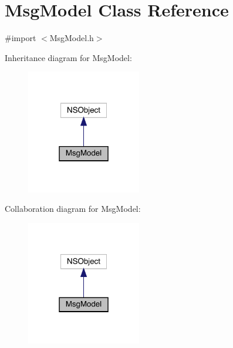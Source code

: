 \hypertarget{interface_msg_model}{}\section{Msg\+Model Class Reference}
\label{interface_msg_model}


{\ttfamily \#import $<$Msg\+Model.\+h$>$}



Inheritance diagram for Msg\+Model\+:\nopagebreak
\begin{figure}[H]
\begin{center}
\leavevmode
\includegraphics[width=142pt]{interface_msg_model__inherit__graph}
\end{center}
\end{figure}


Collaboration diagram for Msg\+Model\+:\nopagebreak
\begin{figure}[H]
\begin{center}
\leavevmode
\includegraphics[width=142pt]{interface_msg_model__coll__graph}
\end{center}
\end{figure}
